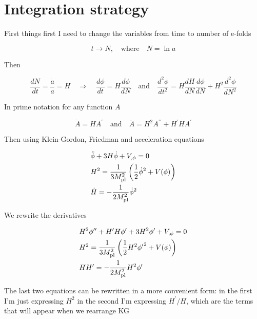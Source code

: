 \section{Integration strategy}

First things first I need to change the variables from time to number of e-folds

\begin{equation*}
    t \rightarrow N, \quad \text{where} \quad N = \ln a
\end{equation*}

Then

\begin{equation*}
    \frac{dN}{dt} = \frac{\dot{a}}{a} = H \quad \Rightarrow \quad \frac{d \phi}{dt} = H \frac{d \phi}{dN} \quad \text{and} \quad \frac{d^2 \phi}{dt^2} = H \frac{dH}{dN} \frac{d \phi}{d N} + H^2 \frac{d^2 \phi}{d N^2} 
\end{equation*}

In prime notation for any function $A$

\begin{equation*}
    \dot{A} = H A^{\prime} \quad \text{and} \quad \ddot{A} = H^2 A^{\prime \prime} + H^{\prime} H A^{\prime}
\end{equation*}

Then using Klein-Gordon, Friedman and acceleration equations

\begin{align*}
    & \ddot{\phi} + 3H \dot{\phi} + V_{, \phi} = 0 \\
    & H^2 = \frac{1}{3 M_{\rm pl}^2   } \left( \frac{1}{2} \dot{\phi}^2 + V(\phi) \right) \\
    & \dot{H} = - \frac{1}{2 M_{\rm pl}^2} \dot{\phi}^2
\end{align*}

We rewrite the derivatives

\begin{align*}
    &H^2 \phi^{\prime \prime} + H^{\prime} H \phi^{\prime} + 3 H^2 \phi^{\prime} + V_{, \phi} = 0 \\
    &H^2 = \frac{1}{3 M_{\rm pl}^2} \left( \frac{1}{2} H^2 {\phi^{\prime}}^2 + V(\phi) \right) \\
    &H H^{\prime} = - \frac{1}{2 M_{\rm pl}^2} H^2 \phi^{\prime}
\end{align*}

The last two equations can be rewritten in a more convenient form: in the first I'm just expressing $H^2$ in the second I'm expressing $H^{\prime} / H$, which are the terms that will appear when we rearrange KG

